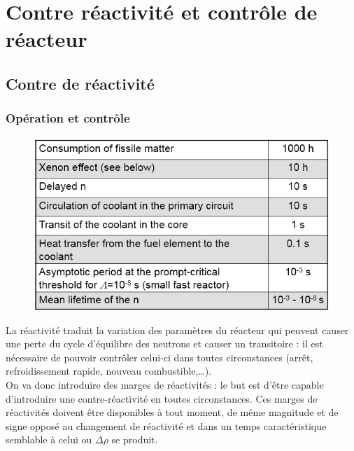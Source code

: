 \chapter{Contre réactivité et contrôle de réacteur}
\section{Contre de réactivité}
	\subsection{Opération et contrôle}
	\begin{figure}
	\vspace{-5mm}
	\includegraphics[scale=0.4]{ch6/image1.png}
	\end{figure}
	La réactivité traduit la variation des paramètres du réacteur qui peuvent causer une perte du 
	cycle d'équilibre des neutrons et causer un transitoire : il est nécessaire de pouvoir contrôler 
	celui-ci dans toutes circonstances (arrêt, refroidissement rapide, nouveau combustible,\dots).\\
	
	On va donc introduire des marges de réactivités : le but est d'être capable d'introduire une 
	contre-réactivité en toutes circonstances. Ces marges de réactivités doivent être disponibles à 
	tout moment, de même magnitude et de signe opposé au changement de réactivité et dans un temps 
	caractéristique semblable à celui ou $\Delta \rho$ se produit.
	
